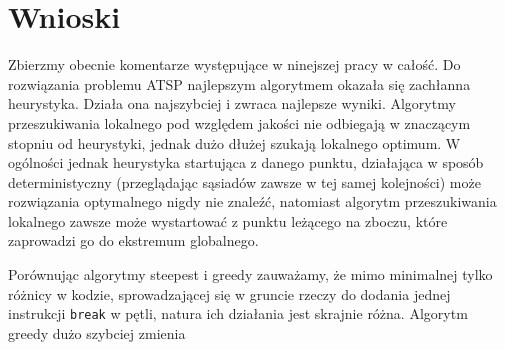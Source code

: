 \section{Wnioski}
Zbierzmy obecnie komentarze występujące w ninejszej pracy w całość. Do rozwiązania problemu ATSP najlepszym algorytmem okazała się zachłanna heurystyka. Działa ona najszybciej i zwraca najlepsze wyniki. Algorytmy przeszukiwania lokalnego pod względem jakości nie odbiegają w znaczącym stopniu od heurystyki, jednak dużo dłużej szukają lokalnego optimum. W ogólności jednak heurystyka startująca z danego punktu, działająca w sposób deterministyczny (przeglądając sąsiadów zawsze w tej samej kolejności) może rozwiązania optymalnego nigdy nie znaleźć, natomiast algorytm przeszukiwania lokalnego zawsze może wystartować z punktu leżącego na zboczu, które zaprowadzi go do ekstremum globalnego.

Porównując algorytmy steepest i greedy zauważamy, że mimo minimalnej tylko różnicy w kodzie, sprowadzającej się w gruncie rzeczy do dodania jednej instrukcji \texttt{break} w pętli, natura ich działania jest skrajnie różna. Algorytm greedy dużo szybciej zmienia 